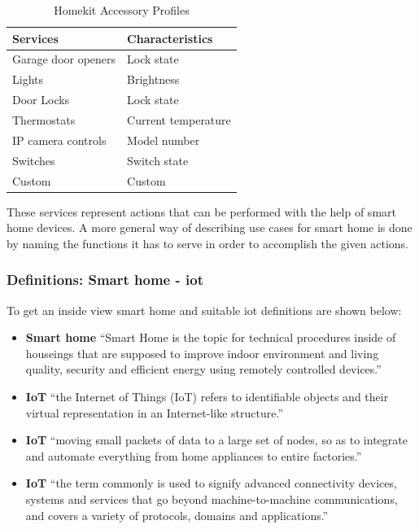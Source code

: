 		\begin{table}[h]
			\centering
			\caption{Homekit Accessory Profiles}
			\label{Homekit_Accessory_Profile}
			\begin{tabular}{ll}
				\textbf{Services}		& \textbf{Characteristics} \\
				\hline
				Garage door openers		& Lock state \\
				Lights					& Brightness \\
				Door Locks				& Lock state \\
				Thermostats				& Current temperature \\
				IP camera controls		& Model number \\
				Switches				& Switch state \\
				Custom					& Custom
			\end{tabular}
		\end{table}

		These services represent actions that can be performed with the help of smart home devices. A more general way of describing use cases for smart home is done by naming the functions it has to serve in order to accomplish the given actions.\\ 

		\subsubsection{Definitions: Smart home - iot}
			To get an inside view smart home and suitable iot definitions are shown below:

			\begin{itemize}
				\item \textbf{Smart home} “Smart Home is the topic for technical procedures inside of houseings that are supposed to improve indoor environment and living quality, security and efficient energy using remotely controlled devices.” \textcite{}

				\item \textbf{IoT} “the Internet of Things (IoT) refers to identifiable objects and their virtual representation in an Internet-like structure.” \parencite{IoTDef1}

				\item \textbf{IoT} “moving small packets of data to a large set of nodes, so as to integrate and automate everything from home appliances to entire factories.” \parencite{IoTDef2}

				\item \textbf{IoT} “the term commonly is used to signify advanced connectivity devices, systems and services that go beyond machine-to-machine communications, and covers a variety of protocols, domains and applications.” \parencite{IoT-Techcrunch}
			\end{itemize}

